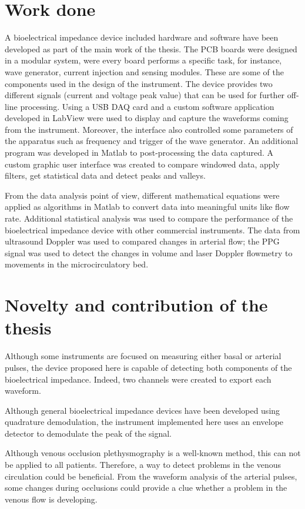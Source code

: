 \section{Work done}
A bioelectrical impedance device included hardware and software have been developed as part of the main work of the thesis. The PCB boards were designed in a modular system, were every board performs a specific task, for instance, wave generator, current injection and sensing modules. These are some of the components used in the design of the instrument. The device provides two different signals (current and voltage peak value) that can be used for further off-line processing. Using a USB DAQ card and a custom software application developed in LabView \cite{LabView:2016} were used to display and capture the waveforms coming from the instrument. Moreover, the interface also controlled some parameters of the apparatus such as frequency and trigger of the wave generator. An additional program was developed in Matlab \cite{MATLAB:2016} to post-processing the data captured. A custom graphic user interface was created to compare windowed data, apply filters, get statistical data and detect peaks and valleys.

From the data analysis point of view, different mathematical equations were applied as algorithms in Matlab to convert data into meaningful units like flow rate. Additional statistical analysis was used to compare the performance of the bioelectrical impedance device with other commercial instruments. The data from ultrasound Doppler was used to compared changes in arterial flow; the PPG signal was used to detect the changes in volume and laser Doppler flowmetry to movements in the microcirculatory bed.

\section{Novelty and contribution of the thesis}
Although some instruments are focused on measuring either basal or arterial pulses, the device proposed here is capable of detecting both components of the bioelectrical impedance.  Indeed, two channels were created to export each waveform. 

Although general bioelectrical impedance devices have been developed using quadrature demodulation, the instrument implemented here uses an envelope detector to demodulate the peak of the signal.

Although venous occlusion plethysmography is a well-known method, this can not be applied to all patients. Therefore, a way to detect problems in the venous circulation could be beneficial. From the waveform analysis of the arterial pulses, some changes during occlusions could provide a clue whether a problem in the venous flow is developing. 

